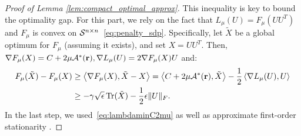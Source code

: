 \begin{proof}[Proof of Lemma \ref{lem:compact_optimal_approx}]
	This inequality is key to bound the optimality gap. For this part, we rely on the fact that $L_\mu(U) = F_\mu(UU^T)$ and $F_\mu$ is convex on $\mathcal{S}^{n\times n}$~\eqref{eq:penalty_sdp}. Specifically, let $\tilde X$ be a global optimum for $F_\mu$ (assuming it exists), and set $X = UU^T$. Then, $\nabla F_\mu(X) = C + 2\mu\mathcal{A}^*(\mathbf{r}), \nabla L_\mu(U) = 2\nabla F_\mu(X)U$ and:
	\begin{align*}
		F_\mu(\tilde X) - F_\mu(X) & \geq \left\langle \nabla F_\mu(X), \tilde X - X \right\rangle  = \left\langle C+2\mu\mathcal{A}^*(\mathbf{r}), \tilde X \right\rangle - \frac{1}{2}\left\langle \nabla L_\mu(U), U \right\rangle \\
								   & \geq -\gamma \sqrt{\epsilon} \operatorname{Tr}(\tilde X) - \frac{1}{2}\epsilon \|U\|_F.
	\end{align*}
	In the last step, we used~\eqref{eq:lambdaminC2mu} as well as approximate first-order stationarity .
%	
\end{proof}


